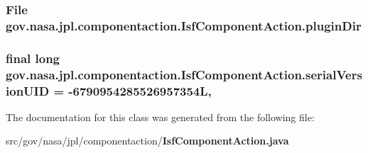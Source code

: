 \subsubsection[{plugin\+Dir}]{\setlength{\rightskip}{0pt plus 5cm}File gov.\+nasa.\+jpl.\+componentaction.\+Isf\+Component\+Action.\+plugin\+Dir\hspace{0.3cm}{\ttfamily [package]}}\label{classgov_1_1nasa_1_1jpl_1_1componentaction_1_1_isf_component_action_a22369b6ea935d0afbdd583a66859fb4f}
\subsubsection[{serial\+Version\+U\+ID}]{\setlength{\rightskip}{0pt plus 5cm}final long gov.\+nasa.\+jpl.\+componentaction.\+Isf\+Component\+Action.\+serial\+Version\+U\+ID = -\/6790954285526957354L\hspace{0.3cm}{\ttfamily [static]}, {\ttfamily [private]}}\label{classgov_1_1nasa_1_1jpl_1_1componentaction_1_1_isf_component_action_a8632e4733aecfc2d4c17b5f2fff2e078}


The documentation for this class was generated from the following file\+:\begin{DoxyCompactItemize}
\item 
src/gov/nasa/jpl/componentaction/{\bf Isf\+Component\+Action.\+java}\end{DoxyCompactItemize}

